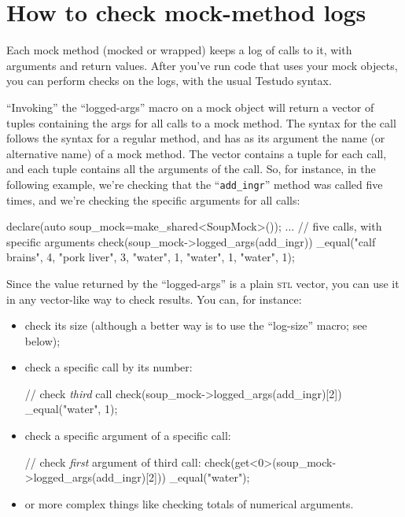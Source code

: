 \documentclass[twoside, a4paper, article]{memoir}
\begin{document}
\section{How to check mock-method logs}
\label{sec:check-mock-method-logs}

Each mock method (mocked or wrapped) keeps a log of calls to it, with arguments
and return values.  After you've run code that uses your mock objects, you can
perform checks on the logs, with the usual Testudo syntax.

``Invoking'' the ``logged-args'' macro on a mock object will return a vector of
tuples containing the args for all calls to a mock method.  The syntax for the
call follows the syntax for a regular method, and has as its argument the name
(or alternative name) of a mock method.  The vector contains a tuple for each
call, and each tuple contains all the arguments of the call.  So, for instance,
in the following example, we're checking that the ``\texttt{add\_ingr}'' method
was called five times, and we're checking the specific arguments for all calls:
\begin{cpplisting}
declare(auto soup_mock=make_shared<SoupMock>());
...
// five calls, with specific arguments
check(soup_mock->logged_args(add_ingr))
  _equal({{"calf brains", 4},
          {"pork liver", 3},
          {"water", 1},
          {"water", 1},
          {"water", 1}});
\end{cpplisting}

Since the value returned by the ``logged-args'' is a plain \textsc{stl} vector,
you can use it in any vector-like way to check results.  You can, for instance:
\begin{itemize}
\item check its size (although a better way is to use the ``log-size'' macro;
  see below);
\item check a specific call by its number:
\begin{cpplisting}
// check \emph{third} call
check(soup_mock->logged_args(add_ingr)[2])
  _equal({"water", 1});
\end{cpplisting}
\item check a specific argument of a specific call:
\begin{cpplisting}
// check \emph{first} argument of third call:
check(get<0>(soup_mock->logged_args(add_ingr)[2]))
  _equal("water");
\end{cpplisting}
\item or more complex things like checking totals of numerical arguments.
\end{itemize}
\end{document}
